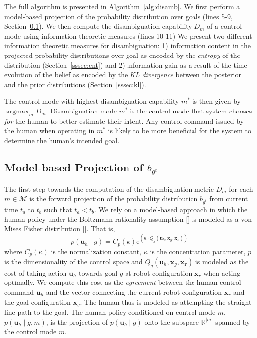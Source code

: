 \documentclass[conference]{IEEEtran}
\DeclareMathOperator*{\argmax}{argmax}
\begin{document}
The full algorithm is presented in Algorithm~\ref{alg:disamb}. We first perform a model-based projection of the probability distribution over goals (lines 5-9, Section~\ref{ssec:model_based}). We then compute the disambiguation capability $D_m$ of a control mode using information theoretic measures (lines 10-11) We present two different information theoretic measures for disambiguation: 1) information content in the projected probability distributions over goal as encoded by the \textit{entropy} of the distribution (Section~\ref{sssec:ent}) and 2) information gain as a result of the time evolution of the belief as encoded by the \textit{KL divergence} between the posterior and the prior distributions (Section~\ref{sssec:kl}). 

The control mode with highest disambiguation capability $m^*$ is then given by $\argmax_m D_m$. Disambiguation mode $m^*$ is the control mode that system chooses \textit{for} the human to better estimate their intent. Any control command issued by the human when operating in $m^*$ is likely to be more beneficial for the system to determine the human's intended goal. 
\subsection{Model-based Projection of $b_{g^t}$}\label{ssec:model_based}
The first step towards the computation of the disambiguation metric $D_m$ for each $m \in \mathcal{M}$ is the forward projection of the probability distribution $b_{g^t}$ from current time $t_a$ to $t_b$ such that $t_a < t_b$. We rely on a model-based approach in which the human policy under the Boltzmann rationality assumption [] is modeled as a von Mises Fisher distribution []. That is,  
\begin{equation}
	p(\boldsymbol{u}_h \;| \;g ) = C_p(\kappa)\text{e}^{(\kappa\cdot Q_g(\boldsymbol{u}_h, \boldsymbol{x}_g, \boldsymbol{x_r}))}
\end{equation}
where $C_p(\kappa)$ is the normalization constant, $\kappa$ is the concentration parameter, $p$ is the dimensionality of the control space and $Q_g(\boldsymbol{u}_h, \boldsymbol{x}_g, \boldsymbol{x_r})$ is modeled as the cost of taking action $\boldsymbol{u}_h$ towards goal $g$ at robot configuration $\boldsymbol{x}_r$ when acting optimally. We compute this cost as the \textit{agreement} between the human control command $\boldsymbol{u}_h$ and the vector connecting the current robot configuration $\boldsymbol{x}_r$ and the goal configuration $\boldsymbol{x}_g$. The human thus is modeled as attempting the straight line path to the goal. The human policy conditioned on control mode $m$, $p(\boldsymbol{u}_h \;| \;g, m )$, is the projection of $p(\boldsymbol{u}_h \;| \;g )$ onto the subspace $\mathbb{R}^{|m|}$ spanned by the control mode $m$. 
\end{document}
